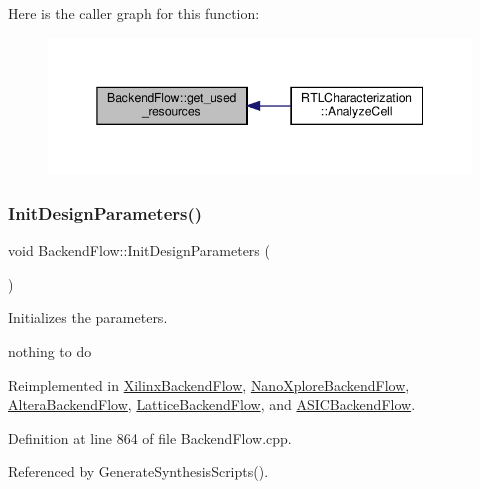 Here is the caller graph for this function\+:
\nopagebreak
\begin{figure}[H]
\begin{center}
\leavevmode
\includegraphics[width=345pt]{da/d75/classBackendFlow_ad80b5e5423a3df382940166a46989f7f_icgraph}
\end{center}
\end{figure}
\mbox{\label{classBackendFlow_a367d9917dc257ed6aa0bb5e97f57d2d4}} 
\subsubsection{\texorpdfstring{Init\+Design\+Parameters()}{InitDesignParameters()}}
{\footnotesize\ttfamily void Backend\+Flow\+::\+Init\+Design\+Parameters (\begin{DoxyParamCaption}{ }\end{DoxyParamCaption})\hspace{0.3cm}{\ttfamily [virtual]}}



Initializes the parameters. 

nothing to do 

Reimplemented in \hyperlink{classXilinxBackendFlow_a60d2b3155b8efbcba6ccf49d543751ea}{Xilinx\+Backend\+Flow}, \hyperlink{classNanoXploreBackendFlow_a56157c2264c3b823bb2a6cb5d1386d63}{Nano\+Xplore\+Backend\+Flow}, \hyperlink{classAlteraBackendFlow_aef7d0e07aaf000ba9d93cdde6761daeb}{Altera\+Backend\+Flow}, \hyperlink{classLatticeBackendFlow_af31a3f147ec929266a696904d911ff6e}{Lattice\+Backend\+Flow}, and \hyperlink{classASICBackendFlow_a57e6be510f2b198c19d47cc6e7e2d0ab}{A\+S\+I\+C\+Backend\+Flow}.



Definition at line 864 of file Backend\+Flow.\+cpp.



Referenced by Generate\+Synthesis\+Scripts().

